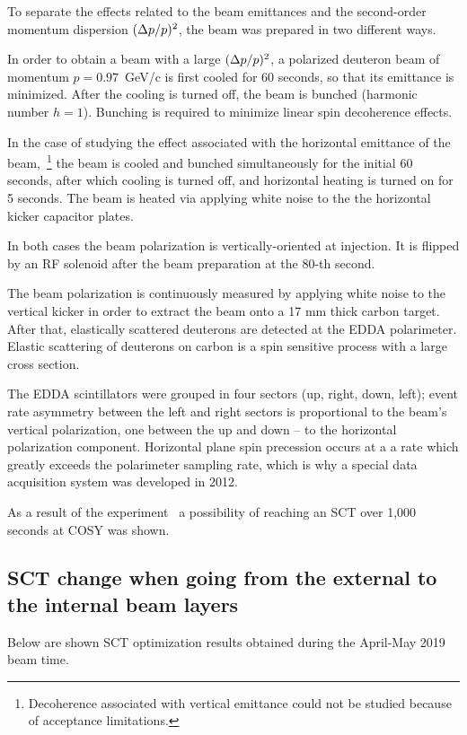 To separate the effects related to the beam emittances and the 
second-order momentum dispersion $(\Delta p/p)^2$, the beam was prepared in two different ways.

In order to obtain a beam with a large $(\Delta p/p)^2$, a polarized deuteron beam of momentum $p=0.97$~GeV/c
is first cooled for 60 seconds, so that its emittance is minimized. After the cooling is turned off, the 
beam is bunched (harmonic number $h=1$). Bunching is required to minimize linear spin decoherence effects.

In the case of studying the effect associated with the horizontal emittance of the beam,~\footnote{
Decoherence associated with vertical emittance could not be studied because of acceptance limitations.
} the beam is cooled and bunched simultaneously for the initial 60 seconds, after which cooling is turned off,
and horizontal heating is turned on for 5 seconds. The beam is heated via applying white noise to the 
the horizontal kicker capacitor plates.

In both cases the beam polarization is vertically-oriented at injection. It is flipped by an RF solenoid 
after the beam preparation at the 80-th second.

The beam polarization is continuously measured by applying white noise to the vertical kicker in order to 
extract the beam onto a 17 mm thick carbon target. After that, elastically scattered deuterons are detected
at the EDDA polarimeter. Elastic scattering of deuterons on carbon is a spin sensitive process with a large cross section.


The EDDA scintillators were grouped in four sectors (up, right, down, left); event rate asymmetry between the
left and right sectors is proportional to the beam's vertical polarization, one between the up and down -- 
to the horizontal polarization component. Horizontal plane spin precession occurs at a a rate which greatly exceeds the polarimeter sampling rate, which is why a special data acquisition system was developed in 2012.~\cite{COSY:DAQ}

As a result of the experiment~\cite{Guidoboni:STORI14} a possibility of reaching an SCT over 1,000 seconds at COSY was shown. 

\subsection{SCT change when going from the external to the internal beam layers}
Below are shown SCT optimization results obtained during the April-May 2019 beam time.


